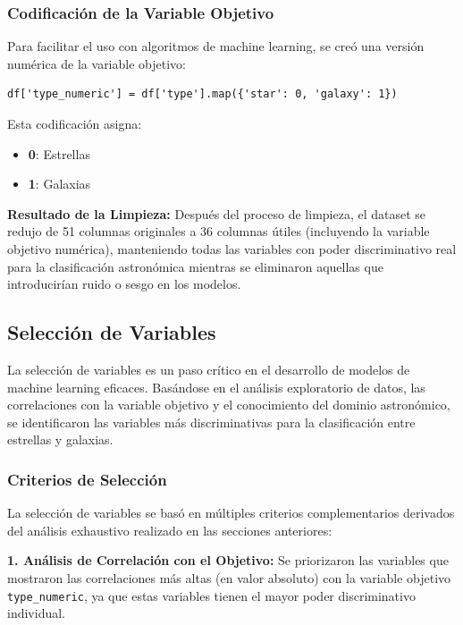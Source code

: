 \documentclass{article}
\begin{document}
\subsubsection{Codificación de la Variable Objetivo}

Para facilitar el uso con algoritmos de machine learning, se creó una versión numérica de la variable objetivo:

\begin{verbatim}
df['type_numeric'] = df['type'].map({'star': 0, 'galaxy': 1})
\end{verbatim}

Esta codificación asigna:
\begin{itemize}
    \item \textbf{0}: Estrellas
    \item \textbf{1}: Galaxias
\end{itemize}

\textbf{Resultado de la Limpieza:}
Después del proceso de limpieza, el dataset se redujo de 51 columnas originales a 36 columnas útiles (incluyendo la variable objetivo numérica), manteniendo todas las variables con poder discriminativo real para la clasificación astronómica mientras se eliminaron aquellas que introducirían ruido o sesgo en los modelos.

\subsection{Selección de Variables}

La selección de variables es un paso crítico en el desarrollo de modelos de machine learning eficaces. Basándose en el análisis exploratorio de datos, las correlaciones con la variable objetivo y el conocimiento del dominio astronómico, se identificaron las variables más discriminativas para la clasificación entre estrellas y galaxias.

\subsubsection{Criterios de Selección}

La selección de variables se basó en múltiples criterios complementarios derivados del análisis exhaustivo realizado en las secciones anteriores:

\textbf{1. Análisis de Correlación con el Objetivo:}
Se priorizaron las variables que mostraron las correlaciones más altas (en valor absoluto) con la variable objetivo \texttt{type\_numeric}, ya que estas variables tienen el mayor poder discriminativo individual.
\end{document}
